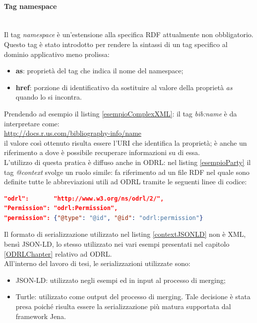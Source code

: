\documentclass[12pt,a4paper,twoside]{book}
\begin{document}
\paragraph{Tag namespace}\mbox{}\\
Il tag \textit{namespace} è un'estensione alla specifica RDF attualmente non obbligatorio. Questo tag è stato introdotto per rendere la sintassi di un tag specifico al dominio applicativo meno prolissa:
\begin{itemize}
 \item \textbf{as}: proprietà del tag che indica il nome del namespace;
 \item \textbf{href}: porzione di identificativo da sostituire al valore della proprietà \textit{as} quando lo si incontra.
\end{itemize} 
Prendendo ad esempio il listing \ref{esempioComplexXML}: il tag \textit{bib:name} è da interpretare come: \\\url{http://docs.r.us.com/bibliography-info/name}\\ il valore così ottenuto risulta essere l'URI che identifica la proprietà; è anche un riferimento a dove è possibile recuperare informazioni su di essa.\\
L'utilizzo di questa pratica è diffuso anche in ODRL: nel listing \ref{esempioParty} il tag \textit{@context} svolge un ruolo simile: fa riferimento ad un file RDF nel quale sono definite tutte le abbreviazioni utili ad ODRL tramite le seguenti linee di codice:
\begin{lstlisting}[language=json,firstnumber=1,caption={Estratto context ODRL\cite{ODRLContext}},captionpos=b,label=contextJSONLD]
"odrl":       "http://www.w3.org/ns/odrl/2/",
"Permission": "odrl:Permission",
"permission": {"@type": "@id", "@id": "odrl:permission"}
\end{lstlisting}
Il formato di serializzazione utilizzato nel listing \ref{contextJSONLD} non è XML, bensì JSON-LD, lo stesso utilizzato nei vari esempi presentati nel capitolo \ref{ODRLChapter} relativo ad ODRL.\\
All'interno del lavoro di tesi, le serializzazioni utilizzate sono:
\begin{itemize}
\item JSON-LD: utilizzato negli esempi ed in input al processo di merging;
\item Turtle\cite{Turtle}: utilizzato come output del processo di merging. Tale decisione è stata presa poiché risulta essere la serializzazione più matura supportata dal framework Jena.
\end{itemize}
\end{document}
